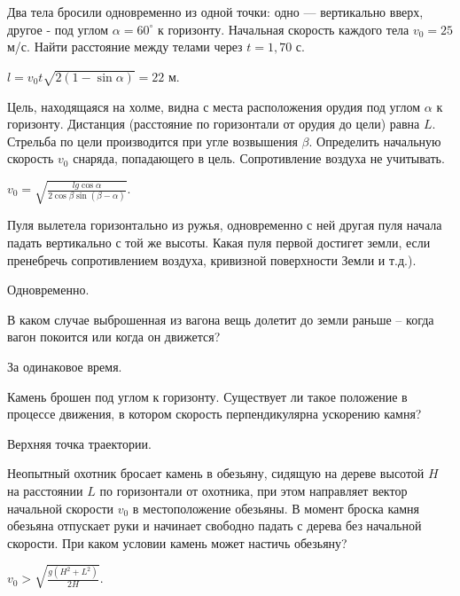\begin{ex} %
Два тела бросили одновременно из одной точки: одно — вертикально вверх, другое - под углом $\alpha = 60^{\circ}$ к горизонту. Начальная скорость каждого тела $v_0 = 25$ м/с. Найти расстояние между телами через $t = 1,70$ с.
\begin{ans}
$l = v_0 t \sqrt{2(1-\sin \alpha)} = 22$ м.
\end{ans}
\end{ex}	

\begin{ex} %
Цель, находящаяся на холме, видна с места расположения орудия под углом $\alpha$ к горизонту. Дистанция (расстояние по горизонтали от орудия до цели) равна $L$. Стрельба по цели производится при угле возвышения $\beta$. Определить начальную скорость $v_0$ снаряда, попадающего в цель. Сопротивление воздуха не учитывать.
\begin{ans}
$v_0 = \sqrt{\frac{lg \cos \alpha}{2 \cos \beta \sin \left( \beta - \alpha \right)}}$.
\end{ans}
\end{ex}

\qualProblems
\begin{ex} %
Пуля вылетела горизонтально из ружья, одновременно с ней другая пуля начала падать вертикально с той же высоты. Какая пуля первой достигет земли, если пренебречь сопротивлением воздуха, кривизной поверхности Земли и т.д.).
\begin{ans}
Одновременно.
\end{ans}
\end{ex}

\begin{ex} %
В каком случае выброшенная из вагона вещь долетит до земли раньше -- когда вагон покоится или когда он движется?
\begin{ans}
За одинаковое время.
\end{ans}
\end{ex}	

\begin{ex} %
Камень брошен под углом к горизонту. Существует ли такое положение в процессе движения, в котором скорость перпендикулярна ускорению камня?
\begin{ans}
Верхняя точка траектории.
\end{ans}
\end{ex}	

\begin{ex} %
Неопытный охотник бросает камень в обезьяну, сидящую на дереве высотой $H$ на расстоянии $L$ по горизонтали от охотника, при этом направляет вектор начальной скорости $v_0$ в местоположение обезьяны. В момент броска камня обезьяна отпускает руки и начинает свободно падать с дерева без начальной скорости. При каком условии камень может настичь обезьяну? 
\begin{ans}
$v_0 > \sqrt{\frac{g(H^2+L^2)}{2H}}$.
\end{ans}
\end{ex}	

